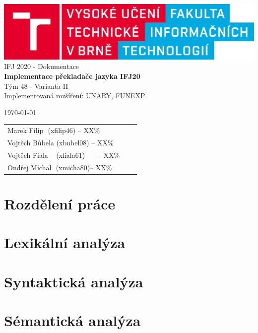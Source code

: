 \documentclass[12pt]{article}
\begin{document}
	\begin{titlepage}
		\begin{center}
			\includegraphics[scale=0.15]{fit_logo.png}
			\\
			{\Large
				 \huge{{IFJ 2020 - Dokumentace\\[0.5em]}}}
				 {\Huge\textbf{{Implementace překladače jazyka IFJ20}}}\\[0.5em]
				 \huge{Tým 48 - Varianta II}\\[0.5em]
				 \smallskip
				 \LARGE{Implementovaná rozšíření: UNARY, FUNEXP}
		\end{center}
		{\Large
		    \today
			\hfill
			\begin{tabular}{l c r}
            Marek Filip \,\,\quad(xfilip46)\hspace{1.62em} -- XX\% \\
            Vojtěch Bůbela (xbubel08)\hspace{1.03em} -- XX\% \\
            Vojtěch Fiala \,\,\,\,\,(xfiala61)\,\,\,\,\,\,\,\,\, -- XX\% \\
            Ondřej Míchal \,\,(xmicha80)\quad -- XX\% \\
            \end{tabular}
			
		}
	\end{titlepage}
    
    \tableofcontents
    
    \newpage
    \section{Rozdělení práce}
    \section{Lexikální analýza}
    \newpage
    \section{Syntaktická analýza}
    \newpage
    \section{Sémantická analýza}
    \newpage
\end{document}
